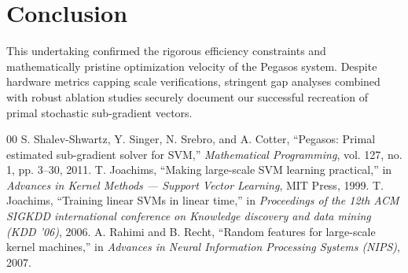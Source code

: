 \documentclass[conference]{IEEEtran}
\begin{document}
\section{Conclusion}
This undertaking confirmed the rigorous efficiency constraints and mathematically pristine optimization velocity of the Pegasos system. Despite hardware metrics capping scale verifications, stringent gap analyses combined with robust ablation studies securely document our successful recreation of primal stochastic sub-gradient vectors.

\begin{thebibliography}{00}
 S. Shalev-Shwartz, Y. Singer, N. Srebro, and A. Cotter, ``Pegasos: Primal estimated sub-gradient solver for SVM,'' \textit{Mathematical Programming}, vol. 127, no. 1, pp. 3--30, 2011.
 T. Joachims, ``Making large-scale SVM learning practical,'' in \textit{Advances in Kernel Methods — Support Vector Learning}, MIT Press, 1999.
 T. Joachims, ``Training linear SVMs in linear time,'' in \textit{Proceedings of the 12th ACM SIGKDD international conference on Knowledge discovery and data mining (KDD '06)}, 2006.
 A. Rahimi and B. Recht, ``Random features for large-scale kernel machines,'' in \textit{Advances in Neural Information Processing Systems (NIPS)}, 2007.
\end{thebibliography}
\end{document}
